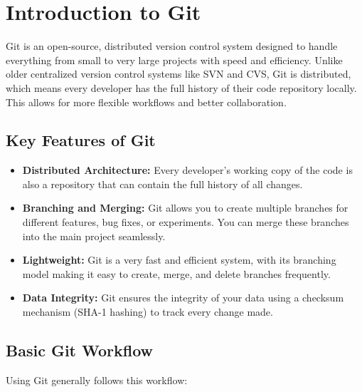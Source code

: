 \section{Introduction to Git}

Git is an open-source, distributed version control system designed to handle everything from small to very large projects with speed and efficiency. Unlike older centralized version control systems like SVN and CVS, Git is distributed, which means every developer has the full history of their code repository locally. This allows for more flexible workflows and better collaboration.

\subsection{Key Features of Git}
\begin{itemize}
    \item \textbf{Distributed Architecture:} Every developer’s working copy of the code is also a repository that can contain the full history of all changes.
    \item \textbf{Branching and Merging:} Git allows you to create multiple branches for different features, bug fixes, or experiments. You can merge these branches into the main project seamlessly.
    \item \textbf{Lightweight:} Git is a very fast and efficient system, with its branching model making it easy to create, merge, and delete branches frequently.
    \item \textbf{Data Integrity:} Git ensures the integrity of your data using a checksum mechanism (SHA-1 hashing) to track every change made.
\end{itemize}

\subsection{Basic Git Workflow}
Using Git generally follows this workflow:

